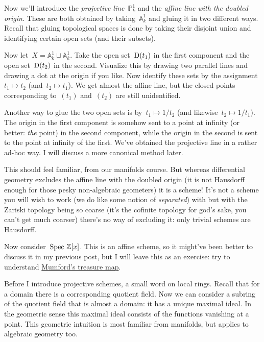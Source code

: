 \begin{example}
  \label{example:projective-line-doubled-origin}
  Now we'll introduce the \emph{projective line}~$\mathbb{P}^1_k$ and the \emph{affine line with the doubled origin}. These are both obtained by taking~$\mathbb{A}^1_k$ and gluing it in two different ways. Recall that gluing topological spaces is done by taking their disjoint union and identifying certain open sets (and their subsets).

  Now let~$X=\mathbb{A}^1_k\sqcup\mathbb{A}^1_k$. Take the open set~$\operatorname{D}(t_1)$ in the first component and the open set~$\operatorname{D}(t_2)$ in the second. Visualize this by drawing two parallel lines and drawing a dot at the origin if you like. Now identify these sets by the assignment~$t_1\mapsto t_2$ (and~$t_2\mapsto t_1$). We get almost the affine line, but the closed points corresponding to~$(t_1)$ and~$(t_2)$ are still unidentified.

  Another way to glue the two open sets is by~$t_1\mapsto 1/t_2$ (and likewise~$t_2\mapsto 1/t_1$). The origin in the first component is somehow sent to a point at infinity (or better: \emph{the} point) in the second component, while the origin in the second is sent to the point at infinity of the first. We've obtained the projective line in a rather ad-hoc way. I will discuss a more canonical method later.

  This should feel familiar, from our manifolds course. But whereas differential geometry excludes the affine line with the doubled origin (it is not Hausdorff enough for those pesky non-algebraic geometers) it is a scheme! It's not a scheme you will wish to work (we do like some notion of \emph{separated}) with but with the Zariski topology being so coarse (it's the cofinite topology for god's sake, you can't get much coarser) there's no way of excluding it: only trivial schemes are Hausdorff.
\end{example}

\begin{example}
  Now consider~$\operatorname{Spec\,}\mathbb{Z}[x]$. This is an affine scheme, so it might've been better to discuss it in my previous post, but I will leave this as an exercise: try to understand \href{http://www.neverendingbooks.org/index.php/mumfords-treasure-map.html}{Mumford's treasure map}.
\end{example}

Before I introduce projective schemes, a small word on local rings. Recall that for a domain there is a corresponding quotient field. Now we can consider a subring of the quotient field that is almost a domain: it has a unique maximal ideal. In the geometric sense this maximal ideal consists of the functions vanishing at a point. This geometric intuition is most familiar from manifolds, but applies to algebraic geometry too.


